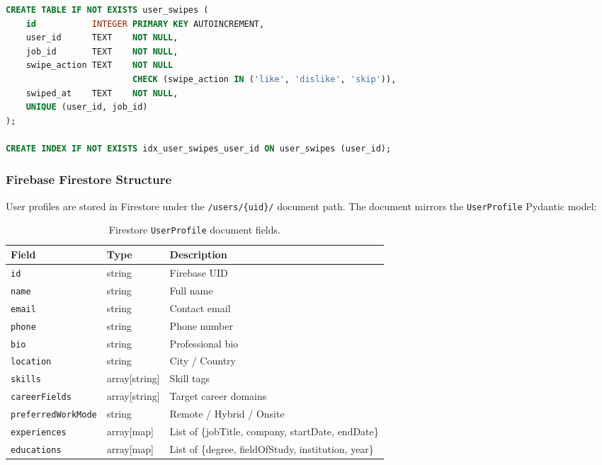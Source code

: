 \documentclass[12pt, a4paper, oneside]{report}
\begin{document}
\begin{lstlisting}[language=SQL, caption={SQLite swipe store schema.}]
CREATE TABLE IF NOT EXISTS user_swipes (
    id           INTEGER PRIMARY KEY AUTOINCREMENT,
    user_id      TEXT    NOT NULL,
    job_id       TEXT    NOT NULL,
    swipe_action TEXT    NOT NULL
                         CHECK (swipe_action IN ('like', 'dislike', 'skip')),
    swiped_at    TEXT    NOT NULL,
    UNIQUE (user_id, job_id)
);

CREATE INDEX IF NOT EXISTS idx_user_swipes_user_id ON user_swipes (user_id);
\end{lstlisting}

\subsubsection*{Firebase Firestore Structure}

User profiles are stored in Firestore under the \texttt{/users/\{uid\}/} document path.
The document mirrors the \texttt{UserProfile} Pydantic model:

\begin{table}[H]
  \centering
  \caption{Firestore \texttt{UserProfile} document fields.}
  \label{tab:firestore-schema}
  \renewcommand{\arraystretch}{1.3}
  \begin{tabularx}{\textwidth}{@{} l l X @{}}
    \toprule
    \textbf{Field}          & \textbf{Type}      & \textbf{Description} \\
    \midrule
    \texttt{id}               & string             & Firebase UID \\
    \texttt{name}             & string             & Full name \\
    \texttt{email}            & string             & Contact email \\
    \texttt{phone}            & string             & Phone number \\
    \texttt{bio}              & string             & Professional bio \\
    \texttt{location}         & string             & City / Country \\
    \texttt{skills}           & array[string]      & Skill tags \\
    \texttt{careerFields}     & array[string]      & Target career domains \\
    \texttt{preferredWorkMode}& string             & Remote / Hybrid / Onsite \\
    \texttt{experiences}      & array[map]         & List of \{jobTitle, company, startDate, endDate\} \\
    \texttt{educations}       & array[map]         & List of \{degree, fieldOfStudy, institution, year\} \\
    \bottomrule
  \end{tabularx}
\end{table}
\end{document}
